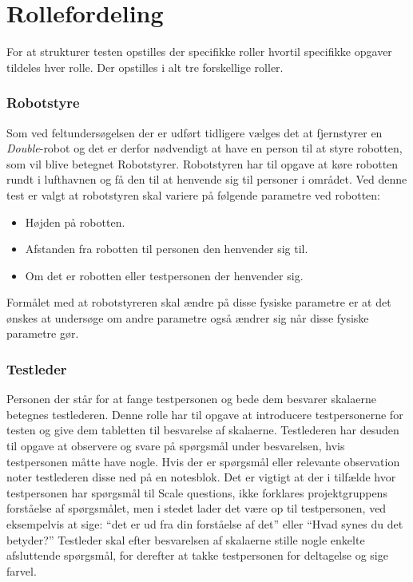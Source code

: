 \section{Rollefordeling}
\label{TestAfSkalaRollefordeling}
%
For at strukturer testen opstilles der specifikke roller hvortil specifikke opgaver tildeles hver rolle. Der opstilles i alt tre forskellige roller. 
%
\subsubsection*{Robotstyre}
Som ved feltundersøgelsen der er udført tidligere vælges det at fjernstyrer en \textit{Double}-robot og det er derfor nødvendigt at have en person til at styre robotten, som vil blive betegnet Robotstyrer. \blankline
%
Robotstyren har til opgave at køre robotten rundt i lufthavnen og få den til at henvende sig til personer i området. Ved denne test er valgt at robotstyren skal variere på følgende parametre ved robotten: 
\begin{itemize}
	\item Højden på robotten. 
	\item Afstanden fra robotten til personen den henvender sig til. 
	\item Om det er robotten eller testpersonen der henvender sig. 
\end{itemize}
Formålet med at robotstyreren skal ændre på disse fysiske parametre er at det ønskes at undersøge om andre parametre også ændrer sig når disse fysiske parametre gør. 

\subsubsection*{Testleder}
Personen der står for at fange testpersonen og bede dem besvarer skalaerne betegnes testlederen. Denne rolle har til opgave at introducere testpersonerne for testen og give dem tabletten til besvarelse af skalaerne. \blankline
%
Testlederen har desuden til opgave at observere og svare på spørgsmål under besvarelsen, hvis testpersonen måtte have nogle. Hvis der er spørgsmål eller relevante observation noter testlederen disse ned på en notesblok. Det er vigtigt at der i tilfælde hvor testpersonen har spørgsmål til Scale questions, ikke forklares projektgruppens forståelse af spørgsmålet, men i stedet lader det være op til testpersonen, ved eksempelvis at sige: “det er ud fra din forståelse af det” eller “Hvad synes du det betyder?” \blankline
% 
Testleder skal efter besvarelsen af skalaerne stille nogle enkelte afsluttende spørgsmål, for derefter at takke testpersonen for deltagelse og sige farvel.  

